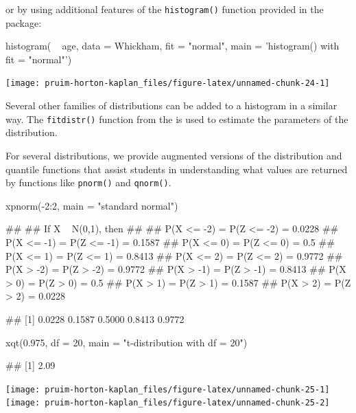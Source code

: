 \noindent
or by using additional features of the \texttt{histogram()} function
provided in the  package:

\begin{Schunk}
\begin{Sinput}
histogram( ~ age, data = Whickham, fit = "normal", 
           main = 'histogram() with fit = "normal"')
\end{Sinput}


\begin{center}\texttt{[image: pruim-horton-kaplan\_files/figure-latex/unnamed-chunk-24-1]} \end{center}

\end{Schunk}

\noindent Several other families of distributions can be added to a
histogram in a similar way. The \texttt{fitdistr()} function from the
 \citep{MASS} is used to estimate the parameters of the
distribution.

For several distributions, we provide augmented versions of the
distribution and quantile functions that assist students in
understanding what values are returned by functions like
\texttt{pnorm()} and \texttt{qnorm()}.

\begin{Schunk}
\begin{Sinput}
xpnorm(-2:2, main = "standard normal")
\end{Sinput}
\begin{Soutput}
## 
## If X ~ N(0,1), then 
## 
##  P(X <= -2) = P(Z <= -2) = 0.0228
##      P(X <= -1) = P(Z <= -1) = 0.1587
##      P(X <= 0) = P(Z <= 0) = 0.5
##      P(X <= 1) = P(Z <= 1) = 0.8413
##      P(X <= 2) = P(Z <= 2) = 0.9772
##  P(X >  -2) = P(Z >  -2) = 0.9772
##      P(X >  -1) = P(Z >  -1) = 0.8413
##      P(X >  0) = P(Z >  0) = 0.5
##      P(X >  1) = P(Z >  1) = 0.1587
##      P(X >  2) = P(Z >  2) = 0.0228
\end{Soutput}
\begin{Soutput}
## [1] 0.0228 0.1587 0.5000 0.8413 0.9772
\end{Soutput}
\begin{Sinput}
xqt(0.975, df = 20, main = "t-distribution with df = 20")
\end{Sinput}
\begin{Soutput}
## [1] 2.09
\end{Soutput}


\begin{center}\texttt{[image: pruim-horton-kaplan\_files/figure-latex/unnamed-chunk-25-1]} \texttt{[image: pruim-horton-kaplan\_files/figure-latex/unnamed-chunk-25-2]} \end{center}

\end{Schunk}

